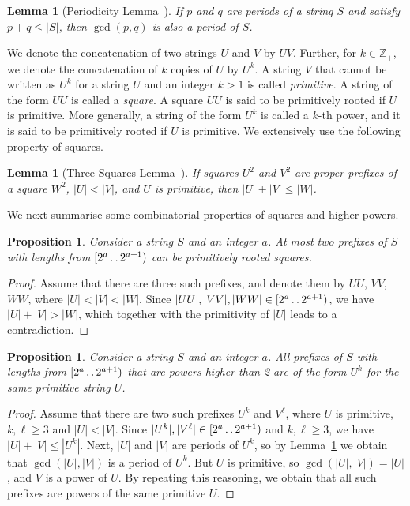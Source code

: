 \documentclass[11pt,letterpaper]{article}
\def\dd{\mathinner{.\,.}}
\newtheorem{proposition}[theorem]{Proposition}
\newtheorem{lemma}[theorem]{Lemma}
\begin{document}
\begin{lemma}[Periodicity Lemma~\cite{fine1965uniqueness}]\label{lem:FW}
If $p$ and $q$ are periods of a string $S$ and satisfy $p + q \leq |S|$, then $\gcd(p, q)$ is also a period of $S$.
\end{lemma}

We denote the concatenation of two strings $U$ and $V$ by $UV$.
Further, for $k \in \mathbb{Z}_+$, we denote the concatenation of $k$ copies of $U$ by $U^k$.
A string $V$ that cannot be written as $U^k$ for a string $U$ and an integer $k>1$ is called \emph{primitive}.
A string of the form $UU$ is called a \emph{square}.
A square $UU$ is said to be primitively rooted if $U$ is primitive.
More generally, a string of the form $U^{k}$ is called a $k$-th power, and it is said to be primitively
rooted if $U$ is primitive.
We extensively use the following property of squares.

\begin{lemma}[Three Squares Lemma~\cite{DBLP:journals/algorithmica/CrochemoreR95}\protect\footnotemark]\label{lem:three_sq}
If squares $U^2$ and $V^2$ are proper prefixes of a square $W^2$, $|U|<|V|$, and $U$ is primitive, then $|U|+|V|\leq |W|$.
\end{lemma}

We next summarise some combinatorial properties of squares and higher powers.

\begin{proposition}\label{lem:two}
Consider a string $S$ and an integer $a$. At most two prefixes of $S$ with lengths from $[2^{a} \dd 2^{a+1})$ can be primitively
rooted squares.
\end{proposition}

\begin{proof}
Assume that there are three such prefixes, and denote them by $UU$, $VV$, $WW$, where
$|U|<|V|<|W|$. Since $|UU|, |VV|, |WW|\in [2^{a} \dd 2^{a+1})$, we have $|U|+|V|>|W|$, which together with the primitivity of $|U|$
leads to a contradiction. 
\end{proof}

\begin{proposition}\label{lem:three}
Consider a string $S$ and an integer $a$. All prefixes of $S$ with lengths from $[2^{a} \dd 2^{a+1})$ that are
powers higher than 2 are of the form $U^{k}$ for the same primitive string $U$.
\end{proposition}

\begin{proof}
Assume that there are two such prefixes $U^{k}$ and $V^{\ell}$, where $U$ is primitive, $k,\ell \geq 3$
and $|U| < |V|$. Since $|U^{k}|, |V^{\ell}|\in [2^{a} \dd 2^{a+1})$ and $k,\ell \geq 3$, we have $|U|+|V| \leq |U^{k}|$.
Next, $|U|$ and $|V|$ are periods of $U^{k}$, so by Lemma~\ref{lem:FW} we obtain that $\gcd(|U|,|V|)$ is a period
of $U^{k}$. But $U$ is primitive, so $\gcd(|U|,|V|)=|U|$, and $V$ is a power of $U$.
By repeating this reasoning, we obtain that all such prefixes are powers of the same primitive $U$.
\end{proof}
\end{document}
